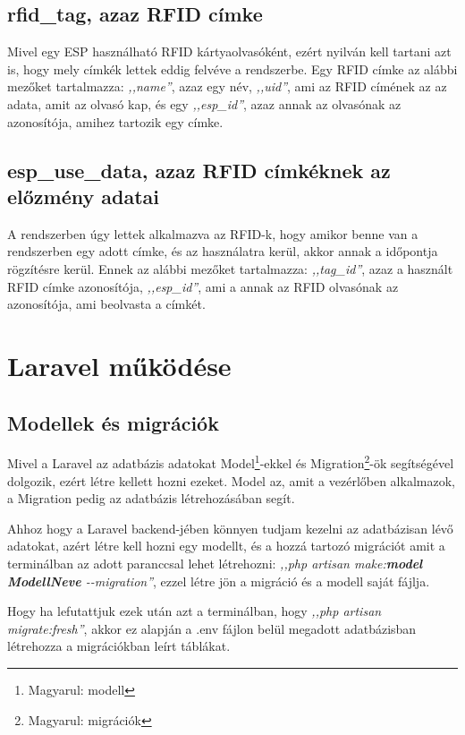 \documentclass[
]{thesis-ekf}
\theoremstyle{definition}
\theoremstyle{remark}
\begin{document}
	\subsection*{rfid\_tag, azaz RFID címke}
	Mivel egy ESP használható RFID kártyaolvasóként, ezért nyilván kell tartani azt is, hogy mely címkék lettek eddig felvéve a rendszerbe. Egy RFID címke az alábbi mezőket tartalmazza: \emph{,,name''}, azaz egy név, \emph{,,uid''}, ami az RFID címének az az adata, amit az olvasó kap, és egy \emph{,,esp\_id''}, azaz annak az olvasónak az azonosítója, amihez tartozik egy címke.
	
	\subsection*{esp\_use\_data, azaz RFID címkéknek az előzmény adatai}
	A rendszerben úgy lettek alkalmazva az RFID-k, hogy amikor benne van a rendszerben egy adott címke, és az használatra kerül, akkor annak a időpontja rögzítésre kerül. Ennek az alábbi mezőket tartalmazza: \emph{,,tag\_id''}, azaz a használt RFID címke azonosítója, \emph{,,esp\_id''}, ami a annak az RFID olvasónak az azonosítója, ami beolvasta a címkét.
	
	\section{Laravel működése}
	
	\subsection{Modellek és migrációk}
	Mivel a Laravel az adatbázis adatokat Model\footnote{Magyarul: modell}-ekkel és Migration\footnote{Magyarul: migrációk}-ök segítségével dolgozik, ezért létre kellett hozni ezeket. 
	Model az, amit a vezérlőben alkalmazok, a Migration pedig az adatbázis létrehozásában segít.\cite{laravel-model}
	
	Ahhoz hogy a Laravel backend-jében könnyen tudjam kezelni az adatbázisan lévő adatokat, azért létre kell hozni egy modellt, és a hozzá tartozó migrációt amit a terminálban az adott paranccsal lehet létrehozni: \emph{,,php artisan make:\textbf{model} \textbf{ModellNeve} \--\--migration''}, ezzel létre jön a migráció és a modell saját fájlja.
	
	
	Hogy ha lefutattjuk ezek után azt a terminálban, hogy \emph{,,php artisan migrate:fresh''}, akkor ez alapján a .env fájlon belül megadott adatbázisban létrehozza a migrációkban leírt táblákat.
	
\end{document}
